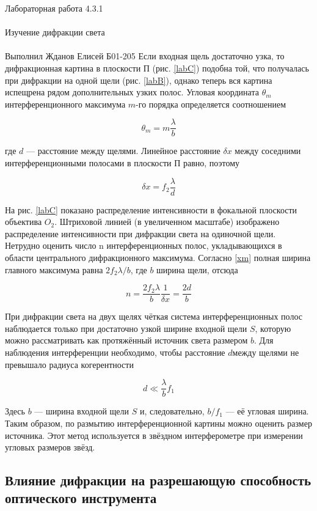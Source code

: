 \documentclass{astroedu-lab}
\begin{document}
\begin{problem}{\huge Лабораторная работа 4.3.1\\\\Изучение дифракции света\\\\Выполнил Жданов Елисей Б01-205}
Если входная щель достаточно узка, то дифракционная картина
в плоскости П (рис. \ref{labC}) подобна той, что получалась при дифракции
на одной щели (рис. \ref{labB}), однако теперь вся картина испещрена рядом
дополнительных узких полос.
Угловая координата $ \theta_m $ интерференционного максимума $ m $-го порядка определяется соотношением

\begin{equation}\label{}
\theta_m = m \dfrac{\lambda}{b}
\end{equation}

где $ d $ --- расстояние между щелями. Линейное расстояние $ \delta x $ между соседними интерференционными полосами в плоскости П равно, поэтому

\begin{equation}\label{dx}
\delta x = f_2 \dfrac{\lambda}{d}
\end{equation}

На рис. \ref{labC} показано распределение интенсивности в фокальной плоскости объектива $ O_2 $. Штриховой линией (в увеличенном масштабе)
изображено распределение интенсивности при дифракции света на одиночной щели. Нетрудно оценить число n интерференционных полос,
укладывающихся в области центрального дифракционного максимума.
Согласно \eqref{xm} полная ширина главного максимума равна $ 2 f_2 \lambda /b $, где $ b $ ширина щели, отсюда

\begin{equation}\label{n}
n = \dfrac{2f_2 \lambda}{b} \dfrac{1}{\delta x} = \dfrac{2d}{b}
\end{equation}

При дифракции света на двух щелях чёткая система интерференционных полос наблюдается только при достаточно узкой ширине входной щели $ S $, которую можно рассматривать как протяжённый источник света размером $ b $. Для наблюдения интерференции необходимо, чтобы расстояние $ d $между щелями не превышало радиуса когерентности

\begin{equation}\label{}
d \ll \dfrac{\lambda}{b} f_1
\end{equation}

Здесь $ b $ --- ширина входной щели $ S $ и, следовательно, $  b/f_1 $ --- её угловая ширина. Таким образом, по размытию интерференционной картины можно оценить размер источника. Этот метод используется в звёздном интерферометре при измерении угловых размеров звёзд.

\subsection{Влияние дифракции на разрешающую способность оптического инструмента}


\end{problem}
\end{document}
